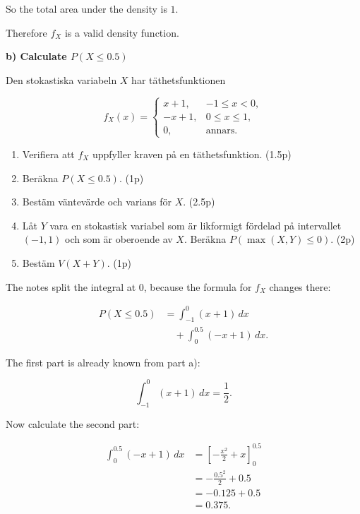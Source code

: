 \documentclass[10pt]{article}
\begin{document}
So the total area under the density is \(1\).

Therefore \(f_X\) is a valid density function.

\textbf{b) Calculate \(P(X\le 0.5)\)}

Den stokastiska variabeln \(X\) har täthetsfunktionen

\[
f_X(x)=
\begin{cases}
x+1, & -1\le x<0,\\
-x+1, & 0\le x\le 1,\\
0, & \text{annars}.
\end{cases}
\]

\begin{enumerate}[label=\alph*)]
\item Verifiera att \(f_X\) uppfyller kraven på en
täthetsfunktion.
\hfill (1.5p)

\item Beräkna \(P(X\le 0.5)\).
\hfill (1p)

\item Bestäm väntevärde och varians för \(X\).
\hfill (2.5p)

\item Låt \(Y\) vara en stokastisk variabel som är
likformigt fördelad på intervallet \((-1,1)\) och som
är oberoende av \(X\).
Beräkna \(P(\max(X,Y)\le 0)\).
\hfill (2p)

\item Bestäm \(V(X+Y)\).
\hfill (1p)
\end{enumerate}

The notes split the integral at \(0\), because the
formula for \(f_X\) changes there:

\begin{align*}
P(X\le 0.5)
&=
\int_{-1}^{0}(x+1)\,dx \\
&\quad+
\int_{0}^{0.5}(-x+1)\,dx.
\end{align*}

The first part is already known from part a):

\[
\int_{-1}^{0}(x+1)\,dx=\frac{1}{2}.
\]

Now calculate the second part:

\begin{align*}
\int_{0}^{0.5}(-x+1)\,dx
&=
\left[
-\frac{x^2}{2}+x
\right]_{0}^{0.5} \\[2mm]
&=
-\frac{0.5^2}{2}+0.5 \\[2mm]
&=
-0.125+0.5 \\[2mm]
&=0.375.
\end{align*}
\end{document}
